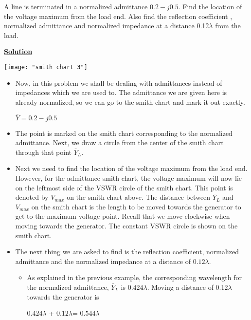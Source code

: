 \begin{example}
	A line is terminated in a normalized admittance $0.2-j0.5$. Find the location of the voltage maximum from the load  end. Also find the reflection coefficient , normalized admittance and normalized impedance at a distance 0.12$\lambda$ from the load.
\end{example}

\begin{center}
	\textbf{\underline{\large Solution}}
\end{center}

\begin{center}
	\centering
	\texttt{[image: "smith chart 3"]}
\end{center}

\begin{itemize}
	\item Now, in this problem we shall be dealing with admittances instead of impedances which we are used to. The admittance we are given here is already normalized, so we can go to the smith chart and mark it out exactly.
	\begin{center}
			$\bar{Y} = 0.2 - j0.5$
	\end{center}
	
	\item 
	The point is marked on the smith chart corresponding to the normalized admittance. Next, we draw a circle from the center of the smith chart through that point $\bar{Y}_L$.
	
	\item 
	Next we need to find the location of the voltage maximum from the load end. However, for the admittance smith chart, the voltage maximum will now lie on the leftmost side of the VSWR circle of the smith chart. This point is denoted by $V_{max}$ on the smith chart above. The distance between  $\bar{Y}_L$ and $V_{max}$ on the smith chart is the length to be moved towards the generator to get to the maximum voltage point. Recall that we move clockwise when moving towards the generator. The constant VSWR circle is shown on the smith chart.
	
	\item
	The next thing we are asked to find is the reflection coefficient, normalized admittance and the normalized impedance at a distance of $0.12\lambda$.
	
	\begin{itemize}
		\item 
	    As explained in the previous example, the corresponding wavelength for the normalized admittance, $\bar{Y}_L$ is $0.424\lambda$. Moving a distance of $0.12\lambda$ towards the generator is 
	    \begin{center}
	    	$0.424\lambda$ + $0.12\lambda$= $0.544\lambda$
	    \end{center}
		

\end{itemize}
\end{itemize}
